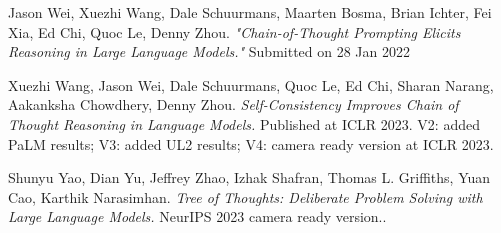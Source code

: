 \documentclass[12pt, a4paper]{article}
\begin{document}
    \pagebreak
    \footnotesize{
        \begin{thebibliography}{99}
        
            Jason Wei, Xuezhi Wang, Dale Schuurmans, Maarten Bosma, Brian Ichter, Fei Xia, Ed Chi, Quoc Le, Denny Zhou.
            \textit{ "Chain-of-Thought Prompting Elicits Reasoning in Large Language Models."}
            Submitted on 28 Jan 2022 
            
            Xuezhi Wang, Jason Wei, Dale Schuurmans, Quoc Le, Ed Chi, Sharan Narang, Aakanksha Chowdhery, Denny Zhou.
            \textit{ Self-Consistency Improves Chain of Thought Reasoning in Language Models.}
            Published at ICLR 2023. V2: added PaLM results; V3: added UL2 results; V4: camera ready version at ICLR 2023.
            
            Shunyu Yao, Dian Yu, Jeffrey Zhao, Izhak Shafran, Thomas L. Griffiths, Yuan Cao, Karthik Narasimhan.
            \textit{Tree of Thoughts: Deliberate Problem Solving with Large Language Models.}
            NeurIPS 2023 camera ready version..
            
        \end{thebibliography}
    }
\end{document}
